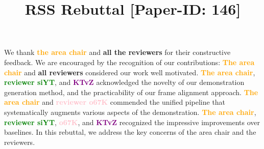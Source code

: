 \documentclass[conference]{IEEEtran}
\begin{document}
\title{RSS Rebuttal [Paper-ID: 146]\vspace{-1cm}}  %
\maketitle
\thispagestyle{empty}


We thank \textbf{\textcolor{orange}{the area chair}} and \textbf{all the reviewers} for their constructive feedback.
We are encouraged by the recognition of our contributions:
\textbf{\textcolor{orange}{The area chair}} and \textbf{all reviewers} considered our work well motivated.
\textbf{\textcolor{orange}{The area chair}}, \textbf{\textcolor{green}{reviewer siYT}}, and \textbf{\textcolor{purple}{KTvZ}} acknowledged the novelty of our demonstration generation method, and the practicability of our frame alignment approach.
\textbf{\textcolor{orange}{The area chair}} and \textbf{\textcolor{pink}{reviewer o67K}} commended the unified pipeline that systematically augments various aspects of the demonstration.
\textbf{\textcolor{orange}{The area chair}}, \textbf{\textcolor{green}{reviewer siYT}}, \textbf{\textcolor{pink}{o67K}}, and \textbf{\textcolor{purple}{KTvZ}} recognized the impressive improvements over baselines.
In this rebuttal, we address the key concerns of the area chair and the reviewers. 

\end{document}
